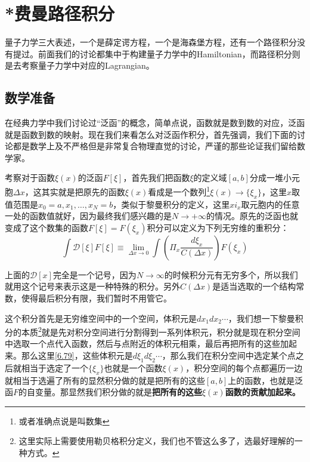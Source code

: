 \documentclass[a4paper,zihao=-4,linespread=1]{ctexrep}
\begin{document}
	\section{*费曼路径积分}
	量子力学三大表述，一个是薛定谔方程，一个是海森堡方程，还有一个路径积分没有提过。前面我们的讨论都集中于构建量子力学中的Hamiltonian，而路径积分则是去考察量子力学中对应的Lagrangian。
	
	\subsection*{数学准备}
	在经典力学中我们讨论过“泛函”的概念，简单点说，函数就是数到数的对应，泛函就是函数到数的映射。现在我们来看怎么对泛函作积分，首先强调，我们下面的讨论都是数学上及不严格但是非常复合物理直觉的讨论，严谨的那些论证我们留给数学家。
	
	考察对于函数$\xi(x)$的泛函$F[\xi]$，首先我们把函数$\xi$的定义域$[a,b]$分成一堆小元胞$\Delta x$，这其实就是把原先的函数$\xi(x)$看成是一个数列\footnote{或者准确点说是叫数集}$\xi(x)\to\{\xi_x\}$，这里$x$取值范围是$x_0=a,x_1,\ldots,x_N=b$，类似于黎曼积分的定义，这里$xi_x$取元胞内的任意一处的函数值就好，因为最终我们感兴趣的是$N\to+\infty$的情况。原先的泛函也就变成了这个数集的函数$F[\xi]=F(\xi_x)$积分可以定义为下列无穷维的重积分：
	\begin{equation}
		\label{6.79}
		\int \mathcal{D}[\xi]F[\xi]\equiv\lim_{\Delta x\to 0}\int\left(\Pi_x\frac{d\xi_x}{C(\Delta x)}\right)F(\xi_x)
	\end{equation}
	
	上面的$\mathcal{D}[x]$完全是一个记号，因为$N\to\infty$的时候积分元有无穷多个，所以我们就用这个记号来表示这是一种特殊的积分。另外$C(\Delta x)$是适当选取的一个结构常数，使得最后积分有限，我们暂时不用管它。
	
	这个积分首先是无穷维空间中的一个空间，体积元是$dx_1dx_2\cdots$，我们想一下黎曼积分的本质\footnote{这里实际上需要使用勒贝格积分定义，我们也不管这么多了，选最好理解的一种方式。}就是先对积分空间进行分割得到一系列体积元，积分就是现在积分空间中选取一个点代入函数，然后与点附近的体积元相乘，最后再把所有的这些加起来。那么这里\ref{6.79}，这些体积元是$d\xi_1d\xi_2\cdots$，那么我们在积分空间中选定某个点之后就相当于选定了一个$\{\xi_x\}$也就是一个函数$\xi(x)$，积分空间的每个点都遍历一边就相当于选遍了所有的显然积分做的就是把所有的这些$[a,b]$上的函数，也就是泛函$F$的自变量。那显然我们积分做的就是\textbf{把所有的这些$\xi(x)$函数的贡献加起来。}
	
\end{document}
